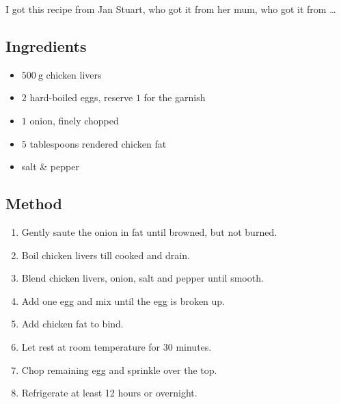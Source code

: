 \documentclass[11pt,a4paper]{article}
\begin{document}
I got this recipe from Jan Stuart, who got it from her mum, who got it from \dots 

\subsection*{Ingredients}

\begin{itemize}
  \item $ \qty{500}{\gram} $ chicken livers
  \item $ 2 $ hard-boiled eggs, reserve $ 1 $ for the garnish
  \item $ 1 $ onion, finely chopped
  \item $ 5 $ tablespoons rendered chicken fat
  \item salt \& pepper
\end{itemize}

\medskip

\subsection*{Method}

\begin{enumerate}
  \item Gently saute the onion in fat until browned, but not burned.
  \item Boil chicken livers till cooked and drain.
  \item Blend chicken livers, onion, salt and pepper until smooth.
  \item Add one egg and mix until the egg is broken up.
  \item Add chicken fat to bind.
  \item Let rest at room temperature for 30 minutes.
  \item Chop remaining egg and sprinkle over the top.
  \item Refrigerate at least 12 hours or overnight.
\end{enumerate}
\end{document}
